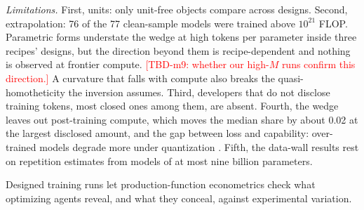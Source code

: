 \textit{Limitations.} First, units: only unit-free objects compare across designs. Second, extrapolation: 76 of the 77
clean-sample models were trained above $10^{21}$ FLOP. Parametric forms understate the wedge at high tokens per
parameter inside three recipes' designs, but the direction beyond them is recipe-dependent and nothing is observed at
frontier compute. \textcolor{red}{[TBD-m9: whether our high-$M$ runs confirm this direction.]} A curvature that falls
with compute also breaks the quasi-homotheticity the inversion assumes. Third, developers that do not disclose
training tokens, most closed ones among them, are absent. Fourth, the wedge leaves out post-training compute, which
moves the median share by about 0.02 at the largest disclosed amount, and the gap between loss and capability:
over-trained models degrade more under quantization \citep{kumar2024scaling}. Fifth, the data-wall results rest on
repetition estimates from models of at most nine billion parameters.

Designed training runs let production-function econometrics check what optimizing agents reveal, and what they
conceal, against experimental variation.
